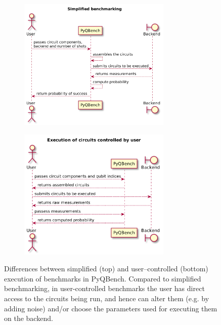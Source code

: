 \documentclass[preprint,12pt, a4paper, dvipsnames]{elsarticle}
\newcommand{\1}{{\rm 1\hspace{-0.9mm}l}}
\theoremstyle{definition}
\begin{document}
\begin{figure}[ht!]
	\centering
	\begin{subfigure}[b]{0.9\textwidth}
		\centering
		\includegraphics[width=0.8\textwidth]{pics/scheme1}
		\label{fig:simplified}
	\end{subfigure}
	\vfill
	\begin{subfigure}[b]{0.9\textwidth}
		\centering
	\includegraphics[width=0.8\textwidth]{pics/scheme2}
		\label{fig:execution}
	\end{subfigure}
	\caption{Differences between simplified (top) and user--controlled (bottom) execution of
	benchmarks in PyQBench. Compared to simplified benchmarking, in user-controlled benchmarks the
	user has direct access to the circuits being run, and hence can alter them (e.g. by adding
	noise) and/or choose the parameters used for executing them on the backend.}
	\label{fig:diagrams}
\end{figure}
\end{document}
